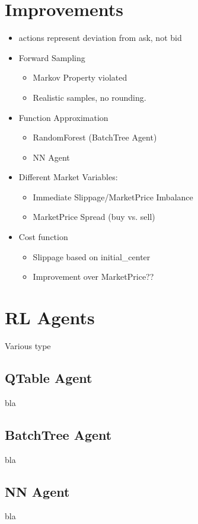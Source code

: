 \section{Improvements}
\begin{itemize}
\item actions represent deviation from ask, not bid
\item Forward Sampling
\begin{itemize}
\item Markov Property violated
\item Realistic samples, no rounding.
\end{itemize}
\item Function Approximation
\begin{itemize}
\item RandomForest (BatchTree Agent)
\item NN Agent
\end{itemize}
\item Different Market Variables:
\begin{itemize}
\item Immediate Slippage/MarketPrice Imbalance
\item MarketPrice Spread (buy vs. sell)
\end{itemize}
\item Cost function
\begin{itemize}
\item Slippage based on initial\_center
\item Improvement over MarketPrice??
\end{itemize}
\end{itemize}

\section{RL Agents}
Various type

\subsection{QTable Agent}
bla

\subsection{BatchTree Agent}
bla

\subsection{NN Agent}
bla

\cleardoublepage{}